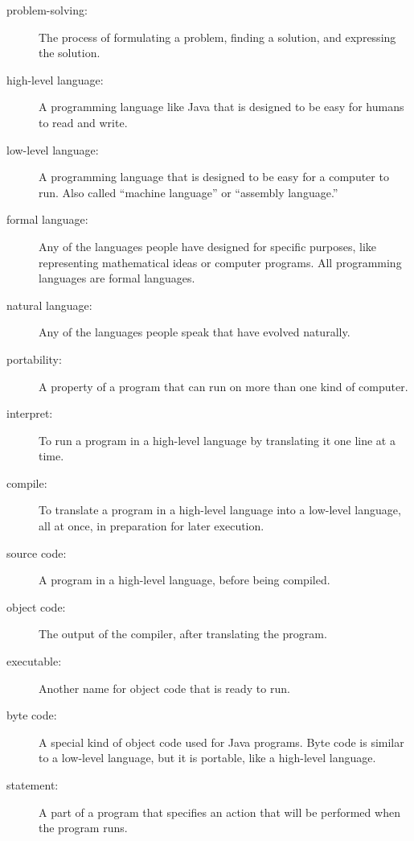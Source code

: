 \documentclass{book}
\begin{document}
\begin{description}

\item[problem-solving:]  The process of formulating a problem, finding
a solution, and expressing the solution.

\item[high-level language:]  A programming language like Java that
is designed to be easy for humans to read and write.

\item[low-level language:]  A programming language that is designed
to be easy for a computer to run.  Also called ``machine
language'' or ``assembly language.''

\item[formal language:]  Any of the languages people have designed
for specific purposes, like representing mathematical ideas or
computer programs.  All programming languages are formal languages.

\item[natural language:]  Any of the languages people speak that
have evolved naturally.

\item[portability:]  A property of a program that can run on more
than one kind of computer.

\item[interpret:]  To run a program in a high-level language
by translating it one line at a time.

\item[compile:]  To translate a program in a high-level language
into a low-level language, all at once, in preparation for later
execution.

\item[source code:]  A program in a high-level language, before
being compiled.

\item[object code:]  The output of the compiler, after translating
the program.

\item[executable:]  Another name for object code that is ready
to run.

\item[byte code:]  A special kind of object code used for Java
programs.  Byte code is similar to a low-level language, but it is
portable, like a high-level language.

\item[statement:] A part of a program that specifies an action
that will be performed when the program runs.


\end{description}
\end{document}
